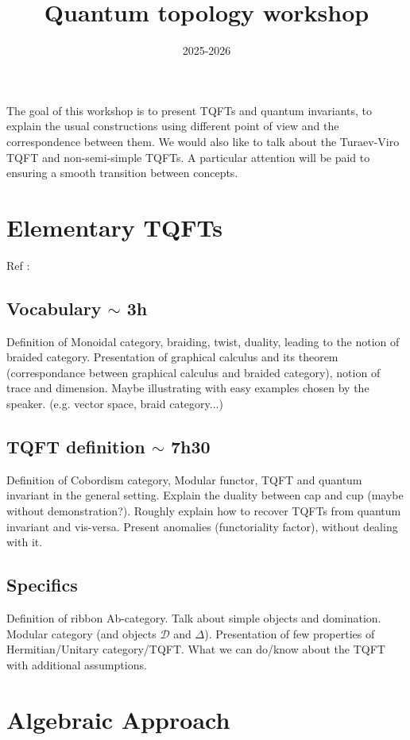 \documentclass{article}
\title{Quantum topology workshop}
\date{2025-2026}
\begin{document}
\maketitle

The goal of this workshop is to present TQFTs and quantum invariants, to explain the usual constructions using different point of view and the correspondence between them. We would also like to talk about the Turaev-Viro TQFT and non-semi-simple TQFTs. A particular attention will be paid to ensuring a smooth transition between concepts.

\section{Elementary TQFTs} Ref : \cite{Tur}
\subsection{Vocabulary $\sim$ 3h} Definition of Monoidal category, braiding, twist, duality, leading to the notion of braided category. Presentation of graphical calculus and its theorem (correspondance between graphical calculus and braided category), notion of trace and dimension. Maybe illustrating with easy examples chosen by the speaker. (e.g. vector space, braid category...)

\subsection{TQFT definition $\sim$ 7h30} Definition of Cobordism category, Modular functor, TQFT and quantum invariant in the general setting. Explain the duality between cap and cup (maybe without demonstration?). Roughly explain how to recover TQFTs from quantum invariant and vis-versa. Present anomalies (functoriality factor), without dealing with it.

\subsection{Specifics} Definition of ribbon Ab-category. Talk about simple objects and domination. Modular category (and objects $\mathcal{D}$ and $\Delta$). Presentation of few properties of Hermitian/Unitary category/TQFT. What we can do/know about the TQFT with additional assumptions.

\section{Algebraic Approach} 
\end{document}
